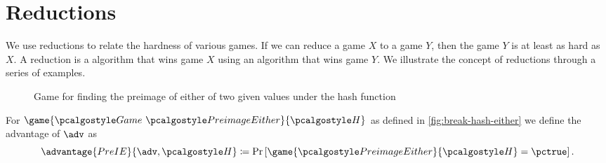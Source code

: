 \section{Reductions}
We use reductions to relate the hardness of various games.
If we can reduce a game $X$ to a game $Y$, then the game $Y$ is at least as hard as $X$.
A reduction is a \ppt algorithm that wins game $X$ using an algorithm that wins game $Y$.
We illustrate the concept of reductions through a series of examples.

\begin{figure}[tbhp]
  \begin{center}
    \begin{tcolorbox}[width=7cm]
      \begin{pchstack}[center]
      \end{pchstack}
    \end{tcolorbox}
  \end{center}
  \caption{Game for finding the preimage of either of two given values under the hash function \label{fig:break-hash-either}}
\end{figure}


\begin{definition}
  For $\game{\Game~\algo{PreimageEither}}{\algo{H}}$ as defined in \autoref{fig:break-hash-either} we define the advantage of $\adv$ as
 \[
  \advantage{PreIE}{\adv, \algo{H}} \defeq \pr{\game{\algo{PreimageEither}}{\algo{H}} = \pctrue}.
 \]
\end{definition}

